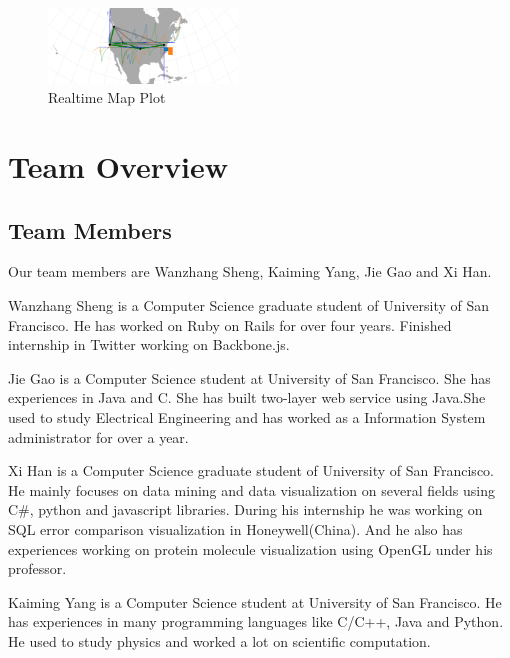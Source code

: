 \documentclass[paper=a4, fontsize=11pt]{report} %
\begin{document}
\begin{description}[style=nextline]
    \begin{figure}[H]
        \begin{center}
            \includegraphics[width=0.45\textwidth]{realtime.png}
        \end{center}
        \caption{Realtime Map Plot}\label{fig:mapplot1}
    \end{figure}

\end{description}




\section{Team Overview} %
\label{sec:team_ovierview}

\subsection{Team Members} %
\label{sub:team_members}
Our team members are Wanzhang Sheng, Kaiming Yang, Jie Gao and Xi Han.

Wanzhang Sheng is a Computer Science graduate student of University of San Francisco. He has worked on Ruby on Rails for over four years. Finished internship in Twitter working on Backbone.js.

Jie Gao is a Computer Science student at University of San Francisco. She has experiences in Java and C. She has built two-layer web service using Java.She used to study Electrical Engineering and has worked as a Information System administrator for over a year.

Xi Han is a Computer Science graduate student of University of San Francisco. He mainly focuses on data mining and data visualization on several fields using C\#, python and javascript libraries. During his internship he was working on SQL error comparison visualization in Honeywell(China). And he also has experiences working on protein molecule visualization using OpenGL under his professor.

Kaiming Yang is a Computer Science student at University of San Francisco. He has experiences in many programming languages like C/C++, Java and Python. He used to study physics and worked a lot on scientific computation.
\end{document}
